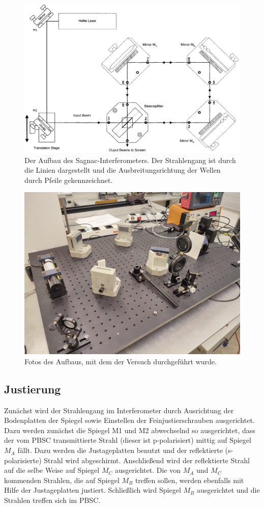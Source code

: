 \begin{figure}
    \centering
    \includegraphics[width=0.7\linewidth]{./figures/aufbau.png}
    \caption{Der Aufbau des Sagnac-Interferometers. Der Strahlengang ist durch die Linien dargestellt und die Ausbreitungsrichtung der Wellen durch Pfeile gekennzeichnet. \cite{V64}}
    \label{fig:aufbau}
\end{figure}

\begin{figure}
    \centering
    \includegraphics[width=0.7\linewidth]{./figures/aufbau_foto.jpeg}
    \caption{Fotos des Aufbaus, mit dem der Versuch durchgeführt wurde.}
    \label{fig:fotos}
\end{figure}

\subsection{Justierung}
Zunächst wird der Strahlengang im Interferometer durch Ausrichtung der Bodenplatten der Spiegel sowie Einstellen der Feinjustierschrauben ausgerichtet. Dazu werden zunächst die Spiegel M1 und M2 abwechselnd so ausgerichtet, dass der vom PBSC transmittierte Strahl (dieser ist p-polarisiert) mittig auf Spiegel $M_A$ fällt. Dazu werden die Justageplatten benutzt und der reflektierte (s-polarisierte) Strahl wird abgeschirmt. Anschließend wird der reflektierte Strahl auf die selbe Weise auf Spiegel $M_C$ ausgerichtet. Die von $M_A$ und $M_C$ kommenden Strahlen, die auf Spiegel $M_B$ treffen sollen, werden ebenfalls mit Hilfe der Justageplatten justiert. Schließlich wird Spiegel $M_B$ ausgerichtet und die Strahlen treffen sich im PBSC.

